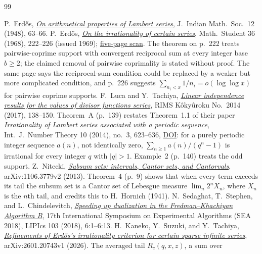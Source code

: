 \begin{thebibliography}{99}
\small
\raggedright
\setlength{\itemsep}{0pt}
 P.~Erd\H{o}s,
  \href{https://www.renyi.hu/~p_erdos/1948-04.pdf}{\emph{On arithmetical
  properties of Lambert series}}, J.~Indian Math.\ Soc.\ 12 (1948), 63--66.
 P.~Erd\H{o}s,
  \href{https://users.renyi.hu/~p_erdos/1969-09.pdf}{\emph{On the
  irrationality of certain series}}, Math.\ Student 36 (1968), 222--226
  (issued 1969); \href{https://www.renyi.hu/~p_erdos/1969-09.pdf}{five-page scan}.  The theorem on p.~222 treats pairwise-coprime support with
  convergent reciprocal sum at every integer base $b\ge2$; the claimed
  removal of pairwise coprimality is stated without proof.  The same page
  says the reciprocal-sum condition could be replaced by a weaker but more
  complicated condition, and p.~226 suggests
  $\sum_{n_i<x}1/n_i=o(\log\log x)$ for pairwise coprime supports.
 F.~Luca and Y.~Tachiya,
  \href{https://www.kurims.kyoto-u.ac.jp/~kyodo/kokyuroku/contents/pdf/2014-14.pdf}
  {\emph{Linear independence results for the values of divisor functions
  series}}, RIMS K\^oky\^uroku No.~2014 (2017), 138--150.  Theorem~A (p.~139)
  restates Theorem~1.1 of their paper \emph{Irrationality of Lambert series
  associated with a periodic sequence}, Int.\ J.~Number Theory 10 (2014),
  no.~3, 623--636,
  \href{https://doi.org/10.1142/S1793042113501121}{DOI}: for a purely periodic
  integer sequence $a(n)$, not identically zero,
  $\sum_{n\ge1}a(n)/(q^n-1)$ is irrational for every integer $q$ with $|q|>1$.
  Example~2 (p.~140) treats the odd support.
 Z.~Nitecki,
  \href{https://arxiv.org/abs/1106.3779v2}{\emph{Subsum sets: intervals, Cantor
  sets, and Cantorvals}}, arXiv:1106.3779v2 (2013).  Theorem~4 (p.~9) shows
  that when every term exceeds its tail the subsum set is a Cantor set of
  Lebesgue measure $\lim_n2^nX_n$, where $X_n$ is the $n$th tail, and credits
  this to H.~Hornich (1941).
 N.~Sedaghat, T.~Stephen, and
  L.~Chindelevitch, \href{https://doi.org/10.4230/LIPIcs.SEA.2018.6}
  {\emph{Speeding up dualization in the Fredman--Khachiyan Algorithm B}},
  17th International Symposium on Experimental Algorithms (SEA 2018),
  LIPIcs 103 (2018), 6:1--6:13.
 H.~Kaneko, Y.~Suzuki, and Y.~Tachiya,
  \href{https://arxiv.org/abs/2601.20743v1}{\emph{Refinements of Erd\H{o}s's
  irrationality criterion for certain sparse infinite series}},
  arXiv:2601.20743v1 (2026).  The averaged tail $R_c(q,x,z)$, a sum over

\end{thebibliography}

